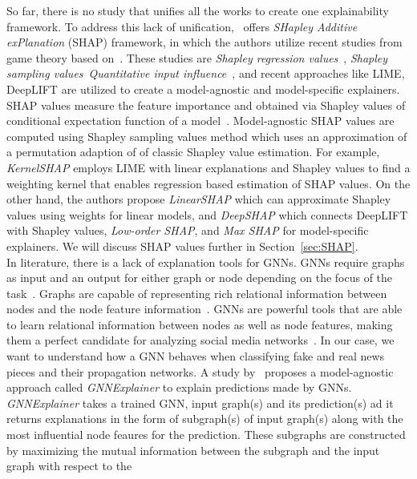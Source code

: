 So far, there is no study that unifies all the works to create one explainability framework. To address this lack of unification,~\cite{AUnifiedApproach_Lundberg} offers \emph{SHapley Additive exPlanation} (SHAP) framework, in which the authors utilize recent studies from game theory based on~\parencite{GameTheory_Shapley}. These studies are \emph{Shapley regression values}~\parencite{AnalysisOfRegressionInGameTheory_Lipovetsky}, \emph{Shapley sampling values}~\parencite{ExplainingPredictionModels_Strumbelj}\emph{Quantitative input influence}~\parencite{AlgorithmicTransparencyViaQuantitativeInputInfluence_Datta}, and recent approaches like LIME, DeepLIFT are utilized to create a model-agnostic and model-specific explainers. SHAP values measure the feature importance and obtained via Shapley values of conditional expectation function of a model~\parencite{AUnifiedApproach_Lundberg}. Model-agnostic SHAP values are computed using Shapley sampling values method which uses an approximation of a permutation adaption of of classic Shapley value estimation. For example, \emph{KernelSHAP} employs LIME with linear explanations and Shapley values to find a weighting kernel that enables regression based estimation of SHAP values. On the other hand, the authors propose \emph{LinearSHAP} which can approximate Shapley values using weights for linear models, and \emph{DeepSHAP} which connects DeepLIFT with Shapley values, \emph{Low-order SHAP}, and \emph{Max SHAP} for model-specific explainers. We will discuss SHAP values further in Section~\ref{sec:SHAP}.\\
In literature, there is a lack of explanation tools for GNNs. GNNs require graphs as input and an output for either graph or node depending on the focus of the task~\parencite{DeepLearningOnGraphs_Zhang}. Graphs are capable of representing rich relational information between nodes and the node feature
information~\parencite{DeepLearningOnGraphs_Zhang, GNNsAReview_Zhou}. GNNs are powerful tools that are able to learn relational information between nodes as well as node features, making them a perfect candidate for analyzing social media networks~\parencite{BeyondSigmoids_Zang}. In our case, we want to understand how a GNN behaves when classifying fake and real news pieces and their propagation networks. A study by~\cite{GNNExplainer_Ying} proposes a model-agnostic approach called \emph{GNNExplainer} to explain predictions made by GNNs. \emph{GNNExplainer} takes a trained GNN, input graph(s) and its prediction(s) ad it returns explanations in the form of subgraph(s) of input
graph(s) along with the most influential node feaures for the prediction. These subgraphs are constructed by maximizing the mutual information between the subgraph and the input graph with respect to the
